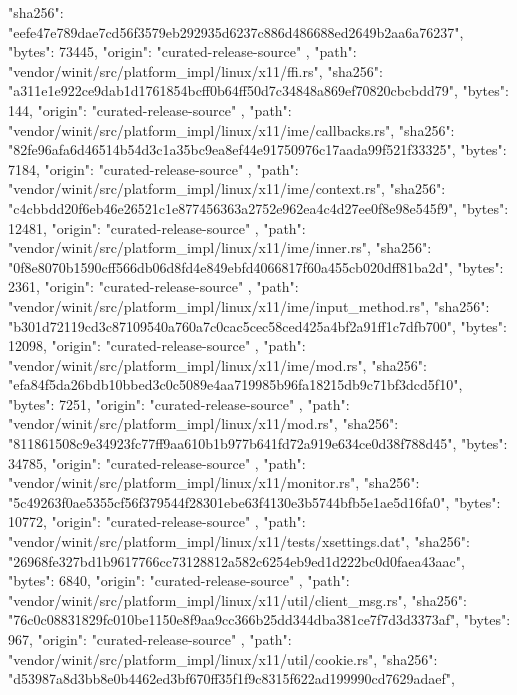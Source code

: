 {{      "sha256": "eefe47e789dae7cd56f3579eb292935d6237c886d486688ed2649b2aa6a76237",
      "bytes": 73445,
      "origin": "curated-release-source"
    },
    {
      "path": "vendor/winit/src/platform_impl/linux/x11/ffi.rs",
      "sha256": "a311e1e922ce9dab1d1761854bcff0b64ff50d7c34848a869ef70820cbcbdd79",
      "bytes": 144,
      "origin": "curated-release-source"
    },
    {
      "path": "vendor/winit/src/platform_impl/linux/x11/ime/callbacks.rs",
      "sha256": "82fe96afa6d46514b54d3c1a35bc9ea8ef44e91750976c17aada99f521f33325",
      "bytes": 7184,
      "origin": "curated-release-source"
    },
    {
      "path": "vendor/winit/src/platform_impl/linux/x11/ime/context.rs",
      "sha256": "c4cbbdd20f6eb46e26521c1e877456363a2752e962ea4c4d27ee0f8e98e545f9",
      "bytes": 12481,
      "origin": "curated-release-source"
    },
    {
      "path": "vendor/winit/src/platform_impl/linux/x11/ime/inner.rs",
      "sha256": "0f8e8070b1590cff566db06d8fd4e849ebfd4066817f60a455cb020dff81ba2d",
      "bytes": 2361,
      "origin": "curated-release-source"
    },
    {
      "path": "vendor/winit/src/platform_impl/linux/x11/ime/input_method.rs",
      "sha256": "b301d72119cd3c87109540a760a7c0cac5cec58ced425a4bf2a91ff1c7dfb700",
      "bytes": 12098,
      "origin": "curated-release-source"
    },
    {
      "path": "vendor/winit/src/platform_impl/linux/x11/ime/mod.rs",
      "sha256": "efa84f5da26bdb10bbed3c0c5089e4aa719985b96fa18215db9c71bf3dcd5f10",
      "bytes": 7251,
      "origin": "curated-release-source"
    },
    {
      "path": "vendor/winit/src/platform_impl/linux/x11/mod.rs",
      "sha256": "811861508c9e34923fc77ff9aa610b1b977b641fd72a919e634ce0d38f788d45",
      "bytes": 34785,
      "origin": "curated-release-source"
    },
    {
      "path": "vendor/winit/src/platform_impl/linux/x11/monitor.rs",
      "sha256": "5c49263f0ae5355cf56f379544f28301ebe63f4130e3b5744bfb5e1ae5d16fa0",
      "bytes": 10772,
      "origin": "curated-release-source"
    },
    {
      "path": "vendor/winit/src/platform_impl/linux/x11/tests/xsettings.dat",
      "sha256": "26968fe327bd1b9617766cc73128812a582c6254eb9ed1d222bc0d0faea43aac",
      "bytes": 6840,
      "origin": "curated-release-source"
    },
    {
      "path": "vendor/winit/src/platform_impl/linux/x11/util/client_msg.rs",
      "sha256": "76c0c08831829fc010be1150e8f9aa9cc366b25dd344dba381ce7f7d3d3373af",
      "bytes": 967,
      "origin": "curated-release-source"
    },
    {
      "path": "vendor/winit/src/platform_impl/linux/x11/util/cookie.rs",
      "sha256": "d53987a8d3bb8e0b4462ed3bf670ff35f1f9c8315f622ad199990cd7629adaef",
}}
